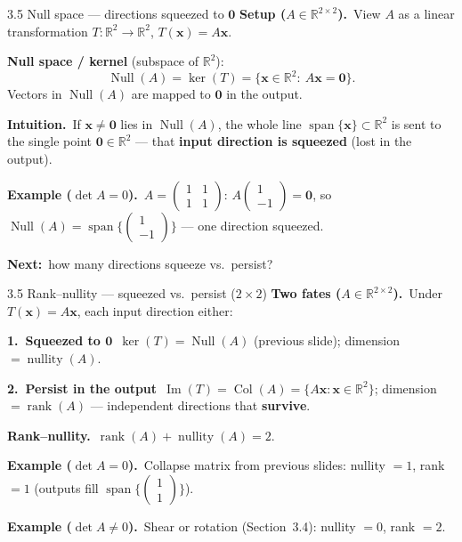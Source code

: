 \documentclass[11pt,aspectratio=169]{beamer}
\begin{document}
\begin{frame}{3.5 Null space --- directions squeezed to $\mathbf{0}$}
  \footnotesize
  \textbf{Setup ($A\in\mathbb{R}^{2\times 2}$).}\
  View $A$ as a linear transformation $T:\mathbb{R}^2\to\mathbb{R}^2$, $T(\mathbf{x})=A\mathbf{x}$.

  \medskip
  \textbf{Null space / kernel} (subspace of $\mathbb{R}^2$):
  \[
    \operatorname{Null}(A)=\ker(T)=\{\mathbf{x}\in\mathbb{R}^2:\ A\mathbf{x}=\mathbf{0}\}.
  \]
  Vectors in $\operatorname{Null}(A)$ are mapped to $\mathbf{0}$ in the output.

  \medskip
  \textbf{Intuition.}\
  If $\mathbf{x}\neq\mathbf{0}$ lies in $\operatorname{Null}(A)$, the whole line
  $\operatorname{span}\{\mathbf{x}\}\subset\mathbb{R}^2$ is sent to the single point
  $\mathbf{0}\in\mathbb{R}^2$ --- that \textbf{input direction is squeezed} (lost in the output).

  \medskip
  \textbf{Example ($\det A=0$).}\
  $A=\begin{pmatrix}1&1\\ 1&1\end{pmatrix}$:
  $A\begin{pmatrix}1\\ -1\end{pmatrix}=\mathbf{0}$, so
  $\operatorname{Null}(A)=\operatorname{span}\bigl\{\begin{pmatrix}1\\ -1\end{pmatrix}\bigr\}$
  --- one direction squeezed.

  \medskip
  \textbf{Next:}\ how many directions squeeze vs.\ persist?
\end{frame}

\begin{frame}{3.5 Rank--nullity --- squeezed vs.\ persist ($2\times 2$)}
  \footnotesize
  \textbf{Two fates ($A\in\mathbb{R}^{2\times 2}$).}\
  Under $T(\mathbf{x})=A\mathbf{x}$, each input direction either:

  \medskip
  \textbf{1.\ Squeezed to $\mathbf{0}$}\
  $\ker(T)=\operatorname{Null}(A)$ (previous slide); dimension $=\operatorname{nullity}(A)$.

  \medskip
  \textbf{2.\ Persist in the output}\
  $\operatorname{Im}(T)=\operatorname{Col}(A)=\{A\mathbf{x}:\mathbf{x}\in\mathbb{R}^2\}$;
  dimension $=\operatorname{rank}(A)$ --- independent directions that \textbf{survive}.

  \medskip
  \textbf{Rank--nullity.}\
  $\operatorname{rank}(A)+\operatorname{nullity}(A)=2$.

  \medskip
  \textbf{Example ($\det A=0$).}\
  Collapse matrix from previous slides: nullity $=1$, rank $=1$
  (outputs fill $\operatorname{span}\bigl\{\begin{pmatrix}1\\ 1\end{pmatrix}\bigr\}$).

  \medskip
  \textbf{Example ($\det A\neq 0$).}\
  Shear or rotation (Section~3.4): nullity $=0$, rank $=2$.
\end{frame}
\end{document}
